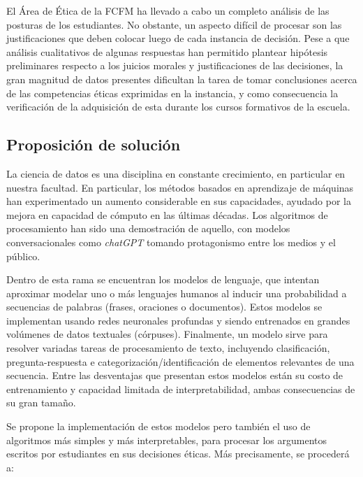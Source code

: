 \documentclass[
	spanish, %
	letterpaper, oneside
]{article}
\begin{document}

\newp El Área de Ética de la FCFM ha llevado a cabo un completo análisis de las posturas de los estudiantes. No obstante, un aspecto difícil de procesar son las justificaciones que deben colocar luego de cada instancia de decisión. Pese a que análisis cualitativos de algunas respuestas han permitido plantear hipótesis preliminares respecto a los juicios morales y justificaciones de las decisiones, la gran magnitud de datos presentes dificultan la tarea de tomar conclusiones acerca de las competencias éticas exprimidas en la instancia, y como consecuencia la verificación de la adquisición de esta durante los cursos formativos de la escuela.


\subsection{Proposición de solución}

La ciencia de datos es una disciplina en constante crecimiento, en particular en nuestra facultad. En particular, los métodos basados en aprendizaje de máquinas han experimentado un aumento considerable en sus capacidades, ayudado por la mejora en capacidad de cómputo en las últimas décadas. Los algoritmos de procesamiento han sido una demostración de aquello, con modelos conversacionales como \textit{chatGPT} tomando protagonismo entre los medios y el público. 

\newp Dentro de esta rama se encuentran los modelos de lenguaje, que intentan aproximar modelar uno o más lenguajes humanos al inducir una probabilidad a secuencias de palabras (frases, oraciones o documentos). Estos modelos se implementan usando redes neuronales profundas y siendo entrenados en grandes volúmenes de datos textuales (córpuses). Finalmente, un modelo sirve para resolver variadas tareas de procesamiento de texto, incluyendo clasificación, pregunta-respuesta e categorización/identificación de elementos relevantes de una secuencia. Entre las desventajas que presentan estos modelos están su costo de entrenamiento y capacidad limitada de interpretabilidad, ambas consecuencias de su gran tamaño.

\newp Se propone la implementación de estos modelos pero también el uso de algoritmos más simples y más interpretables, para procesar los argumentos escritos por estudiantes en sus decisiones éticas. Más precisamente, se procederá a:
\end{document}
